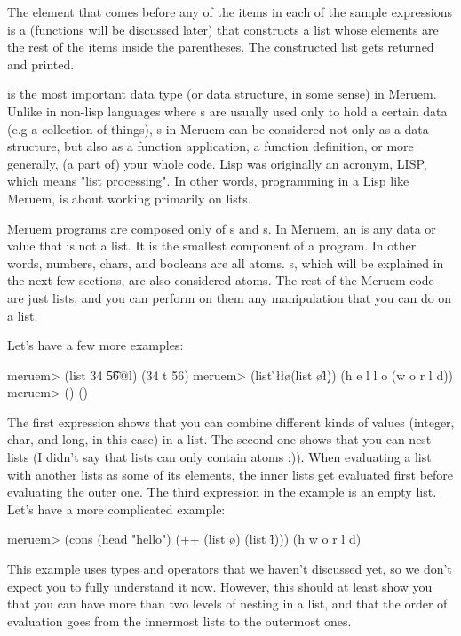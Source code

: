 The  element that comes before any of the items in each of the sample expressions is a  (functions will be discussed later) that constructs a list whose elements are the rest of the items inside the parentheses. The constructed list gets returned and printed.

 is the most important data type (or data structure, in some sense) in Meruem. Unlike in non-lisp languages where s are usually used only to hold a certain data (e.g a collection of things), s in Meruem can be considered not only as a data structure, but also as a function application, a function definition, or more generally, (a part of) your whole code. Lisp was originally an acronym, LISP, which means "list processing". In other words, programming in a Lisp like Meruem, is about working primarily on lists. 

Meruem programs are composed only of s and s. In Meruem, an  is any data or value that is not a list. It is the smallest component of a program. In other words, numbers, chars, and booleans are all atoms. s, which will be explained in the next few sections, are also considered atoms. The rest of the Meruem code are just lists, and you can perform on them any manipulation that you can do on a list.

Let's have a few more examples:

\begin{REPL}
meruem> (list 34 \t 56@l) 
(34 t 56)
meruem> (list \h \e \l \l \o (list \w \o \r \l \d))
(h e l l o (w o r l d))
meruem> ()
()
\end{REPL}

The first expression shows that you can combine different kinds of values (integer, char, and long, in this case) in a list. The second one shows that you can nest lists (I didn't say that lists can only contain atoms :)). When evaluating a list with another lists as some of its elements, the inner lists get evaluated first before evaluating the outer one. The third expression in the example is an empty list. Let's have a more complicated example:

\begin{REPL}
meruem> (cons (head "hello") (++ (list \w \o) (list \r \l \d)))     
(h w o r l d)
\end{REPL}

This example uses types and operators that we haven't discussed yet, so we don't expect you to fully understand it now. However, this should at least show you that you can have more than two levels of nesting in a list, and that the order of evaluation goes from the innermost lists to the outermost ones.

